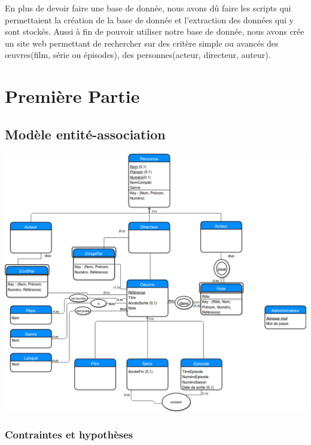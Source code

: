 \documentclass[10pt,a4paper]{article}
\begin{document}
En plus de devoir faire une base de donnée, nous avons dû faire les scripts qui permettaient la création de la base de donnée et l'extraction des données qui y sont stockés. Aussi à fin de pouvoir utiliser notre base de donnée, nous avons crée un site web permettant de rechercher sur des critère simple ou avancés des œuvres(film, série ou épisodes), des personnes(acteur, directeur, auteur).

\newpage
\section{Première Partie}\label{première partie}

\subsection{Modèle entité-association}

\includegraphics[width = 17cm]{Diag_E-A}

\subsubsection{Contraintes et hypothèses}
\end{document}
